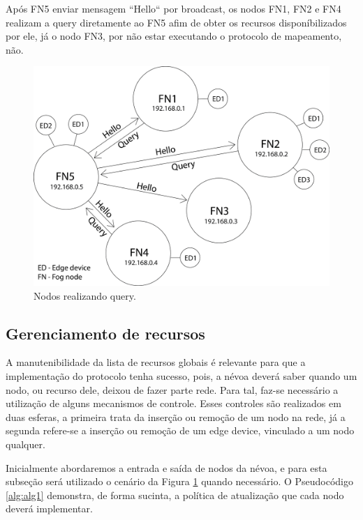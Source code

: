 Após FN5 enviar mensagem  “Hello“ por broadcast, os nodos FN1, FN2 e FN4 realizam a query diretamente ao FN5 afim de obter os recursos disponíbilizados por ele,
já o nodo FN3, por não estar executando o protocolo de mapeamento, não.


\begin{figure}[htb!]
    \centering\includegraphics[width=.5\textwidth]{fig6.png}
    \caption%
    {\label{fig:fig6} Nodos realizando query.}
\end{figure}


\subsection{Gerenciamento de recursos}

A manutenibilidade da lista de recursos globais é relevante para que a implementação do protocolo tenha sucesso, pois, a névoa deverá saber quando um nodo, ou recurso dele, deixou de fazer parte rede.
Para tal, faz-se necessário a utilização de alguns mecanismos de controle.
Esses controles são realizados em duas esferas, a primeira trata da inserção ou remoção de um nodo na rede,
já a segunda refere-se a inserção ou remoção de um edge device, vinculado a um nodo qualquer.



Inicialmente abordaremos a entrada e saída de nodos da névoa, e para esta subseção será utilizado o cenário da Figura \ref{fig:fig6} quando necessário.
O Pseudocódigo \ref{alg:alg1} demonstra, de forma sucinta, a política de atualização que cada nodo deverá implementar.

